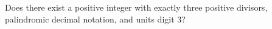 Does there exist a positive integer with exactly three positive divisors, palindromic decimal notation, and units digit $3$?
